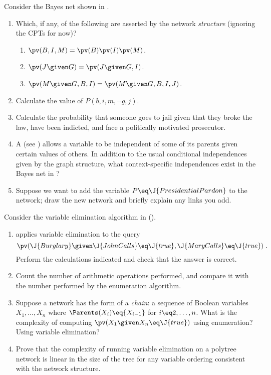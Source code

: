\begin{iexercise}
Consider the Bayes net shown in .
\begin{enumerate}
\item Which, if any, of the following are asserted by the 
network {\em structure} (ignoring the CPTs for now)?
\begin{enumerate}
\item \(\pv(B,I,M) = \pv(B)\pv(I)\pv(M)\).
\item \(\pv(J\given G) = \pv(J\given G,I)\).
\item \(\pv(M\given G,B,I) = \pv(M\given G,B,I,J)\).
\end{enumerate}
\item Calculate the value of \(P(b,i,m,\lnot g,j)\).
\item Calculate the probability that someone goes to jail given that they
broke the law, have been indicted, and face a politically motivated prosecutor.
\item A  (see )
allows a variable to be independent of some of its parents given certain values of others. In addition to the usual
conditional independences given by the graph structure, what context-specific independences
exist in the Bayes net in ?
\item Suppose we want to add the variable \(P\eq \J{PresidentialPardon}\)
to the network; draw the new network and 
briefly explain any links you add.
\end{enumerate}
\end{iexercise} 



\begin{exercise}[VE-exercise]
Consider the variable elimination algorithm  in
 (). 
\begin{enumerate}
\item {} applies
variable elimination to the query 
\[
  \pv(\J{Burglary}\given \J{JohnCalls}\eq \J{true},\J{MaryCalls}\eq \J{true})\ .
\]
Perform the calculations indicated and check that the answer is correct.
\item Count the number of arithmetic operations performed,
and compare it with the number performed by the enumeration algorithm.
\item Suppose a network has the form of a {\em chain}: a sequence of
Boolean variables \(X_1,\ldots, X_n\) where \(\Parents(X_i)\eq \{X_{i-1}\}\) for
\(i\eq 2,\ldots,n\). What is the complexity of computing \(\pv(X_1\given X_n\eq
\J{true})\) using enumeration? Using variable elimination?
\item Prove that the complexity of running variable elimination on a
polytree network is linear in the size of the tree for any variable ordering
consistent with the network structure.
\end{enumerate}
\end{exercise} 

